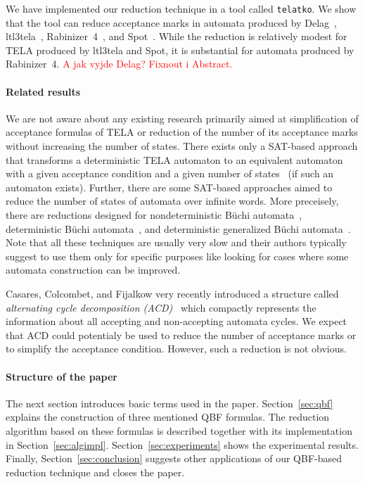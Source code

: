 \documentclass[a4paper,UKenglish,cleveref, autoref, thm-restate]{lipics-v2021}
\newcommand{\todo}[1]{\textcolor{red}{#1}}
\begin{document}
We have implemented our reduction technique in a tool called
\texttt{telatko}. We show that the tool can reduce acceptance marks in
automata produced by Delag~\cite{muller.17.gandalf},
ltl3tela~\cite{major.19.atva}, Rabinizer~4~\cite{kretinsky.18.cav},
and Spot~\cite{duret.16.atva2}.  While the reduction is relatively
modest for TELA produced by ltl3tela and Spot, it is substantial for
automata produced by Rabinizer~4. \todo{A jak vyjde Delag? Fixnout i
  Abstract.}

\paragraph*{Related results}
We are not aware about any existing research primarily aimed at
simplification of acceptance formulas of TELA or reduction of the
number of its acceptance marks without increasing the number of
states. There exists only a SAT-based approach that transforms a
deterministic TELA automaton to an equivalent automaton with a given
acceptance condition and a given number of
states~\cite{baarir.15.lpar} (if such an automaton exists). Further,
there are some SAT-based approaches aimed to reduce the number of
states of automata over infinite words. More preceisely, there are
reductions designed for nondeterministic Büchi
automata~\cite{ehlers.10.spin}, deterministic Büchi
automata~\cite{ehlers.10.sat}, and deterministic generalized Büchi
automata~\cite{baarir.14.forte}. Note that all these techniques are
usually very slow and their authors typically suggest to use them only
for specific purposes like looking for cases where some automata
construction can be improved.

Casares, Colcombet, and Fijalkow very recently introduced a structure
called \emph{alternating cycle decomposition
  (ACD)}~\cite{casares.21.icalp} which compactly represents the
information about all accepting and non-accepting automata cycles. We
expect that ACD could potentialy be used to reduce the number of
acceptance marks or to simplify the acceptance condition. However,
such a reduction is not obvious.

\paragraph*{Structure of the paper} The next section introduces basic
terms used in the paper. Section~\ref{sec:qbf} explains the
construction of three mentioned QBF formulas. The reduction algorithm
based on these formulas is described together with its implementation
in Section~\ref{sec:algimpl}. Section~\ref{sec:experiments} shows the
experimental results. Finally, Section~\ref{sec:conclusion} suggests
other applications of our QBF-based reduction technique and closes the
paper.
\end{document}
